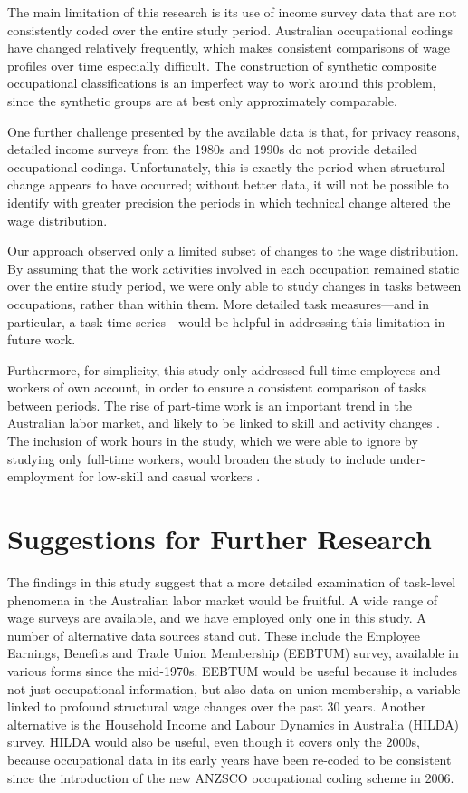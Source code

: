 The main limitation of this research is its use of income survey data that are not consistently coded over the entire study period. Australian occupational codings have changed relatively frequently, which makes consistent comparisons of wage profiles over time especially difficult. The construction of synthetic composite occupational classifications is an imperfect way to work around this problem, since the synthetic groups are at best only approximately comparable.

One further challenge presented by the available data is that, for privacy reasons, detailed income surveys from the 1980s and 1990s do not provide detailed occupational codings. Unfortunately, this is exactly the period when structural change appears to have occurred; without better data, it will not be possible to identify with greater precision the periods in which technical change altered the wage distribution.

Our approach observed only a limited subset of changes to the wage distribution. By assuming that the work activities involved in each occupation remained static over the entire study period, we were only able to study changes in tasks between occupations, rather than within them. More detailed task measures---and in particular, a task time series---would be helpful in addressing this limitation in future work.

Furthermore, for simplicity, this study only addressed full-time employees and workers of own account, in order to ensure a consistent comparison of tasks between periods. The rise of part-time work is an important trend in the Australian labor market, and likely to be linked to skill and activity changes \citep[see][]{Esposto2012}. The inclusion of work hours in the study, which we were able to ignore by studying only full-time workers, would broaden the study to include under-employment for low-skill and casual workers \citep{Briggs2006}.

\section{Suggestions for Further Research}

The findings in this study suggest that a more detailed examination of task-level phenomena in the Australian labor market would be fruitful. A wide range of wage surveys are available, and we have employed only one in this study. A number of alternative data sources stand out. These include the Employee Earnings, Benefits and Trade Union Membership (EEBTUM) survey, available in various forms since the mid-1970s. EEBTUM would be useful because it includes not just occupational information, but also data on union membership, a variable linked to profound structural wage changes over the past 30 years. Another alternative is the Household Income and Labour Dynamics in Australia (HILDA) survey. HILDA would also be useful, even though it covers only the 2000s, because occupational data in its early years have been re-coded to be consistent since the introduction of the new ANZSCO occupational coding scheme in 2006.

